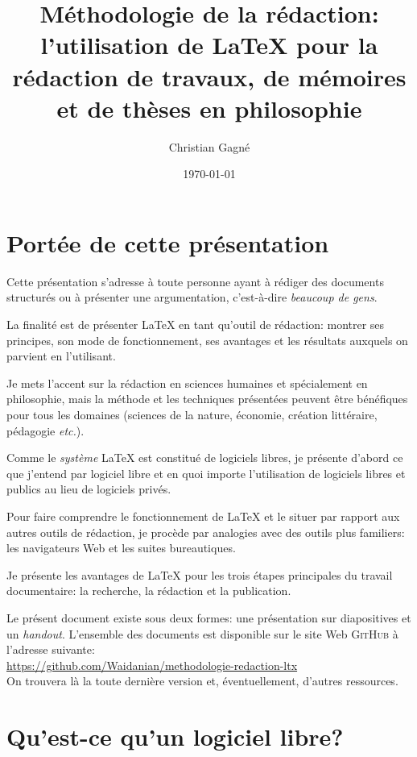 \documentclass{article}
\title{Méthodologie de la rédaction: l’utilisation de \LaTeX{} pour la rédaction de travaux, de mémoires et de thèses en philosophie}
\author{Christian Gagné}
\date{\today}
\newcommand\entite[1]{{\textsc{#1}}}
\begin{document}
\maketitle

\tableofcontents

\section{Portée de cette présentation}

Cette présentation s’adresse à toute personne ayant à rédiger des documents structurés ou à présenter une argumentation, c’est-à-dire \emph{beaucoup de gens}.

La finalité est de présenter \LaTeX{} en tant qu’outil de rédaction: montrer ses principes, son mode de fonctionnement, ses avantages et les résultats auxquels on parvient en l’utilisant.

Je mets l’accent sur la rédaction en sciences humaines et spécialement en philosophie, mais la méthode et les techniques présentées peuvent être bénéfiques pour tous les domaines (sciences de la nature, économie, création littéraire, pédagogie \emph{etc.}).

Comme le \emph{système} \LaTeX{} est constitué de logiciels libres, je présente d’abord ce que j’entend par logiciel libre et en quoi importe l’utilisation de logiciels libres et publics au lieu de logiciels privés.

Pour faire comprendre le fonctionnement de \LaTeX{} et le situer par rapport aux autres outils de rédaction, je procède par analogies avec des outils plus familiers: les navigateurs Web et les suites bureautiques.

Je présente les avantages de \LaTeX{} pour les trois étapes principales du travail documentaire: la recherche, la rédaction et la publication.

Le présent document existe sous deux formes: une présentation sur diapositives et un \emph{handout}. L’ensemble des documents est disponible sur le site Web \entite{GitHub} à l’adresse suivante: \\
\url{https://github.com/Waidanian/methodologie-redaction-ltx} \\
On trouvera là la toute dernière version et, éventuellement, d’autres ressources.

\section{Qu’est-ce qu’un logiciel libre?}
\end{document}
